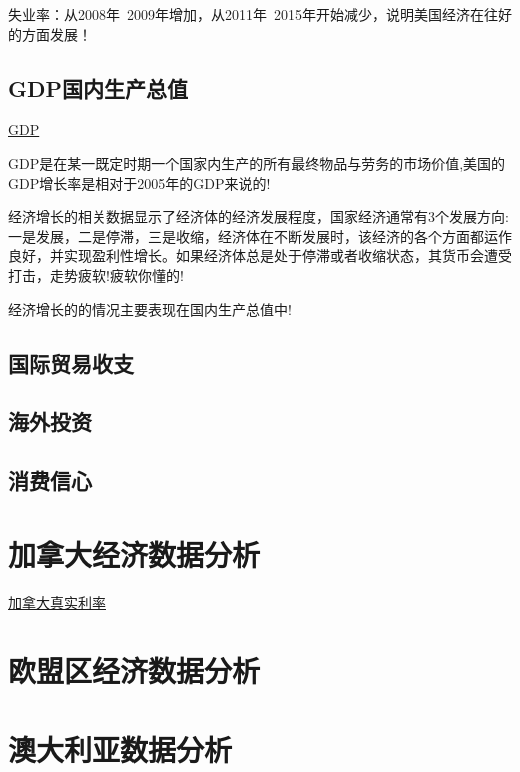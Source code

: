 失业率：从2008年~2009年增加，从2011年~2015年开始减少，说明美国经济在往好的方面发展！

\subsection{GDP国内生产总值}
\href{http://data.worldbank.org/indicator/NY.GDP.MKTP.KD.ZG/countries/1W-US?display=graph}{GDP}


GDP是在某一既定时期一个国家内生产的所有最终物品与劳务的市场价值,美国的GDP增长率是相对于2005年的GDP来说的!


经济增长的相关数据显示了经济体的经济发展程度，国家经济通常有3个发展方向:一是发展，二是停滞，三是收缩，经济体在不断发展时，该经济的各个方面都运作良好，并实现盈利性增长。如果经济体总是处于停滞或者收缩状态，其货币会遭受打击，走势疲软!疲软你懂的!

经济增长的的情况主要表现在国内生产总值中!


\subsection{国际贸易收支}

\subsection{海外投资}
\subsection{消费信心}



\section{加拿大经济数据分析}

\href{http://data.worldbank.org/indicator/FR.INR.RINR/countries/CA?display=graph}{加拿大真实利率}

\section{欧盟区经济数据分析}


\section{澳大利亚数据分析}
